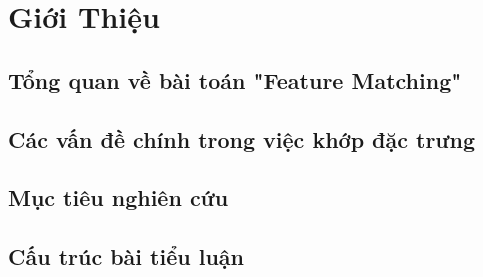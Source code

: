 \newpage
\section{Giới Thiệu}
\subsection{Tổng quan về bài toán "Feature Matching"}
\subsection{Các vấn đề chính trong việc khớp đặc trưng}
\subsection{Mục tiêu nghiên cứu}
\subsection{Cấu trúc bài tiểu luận}